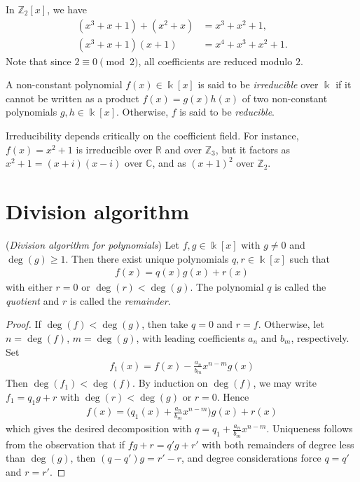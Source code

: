 \documentclass[a4paper, 12pt]{book} %
\begin{document}
\begin{example}
    In $\mathbb{Z}_2[x]$, we have
    \begin{align}
        (x^3 + x + 1) + (x^2 + x) &= x^3 + x^2 + 1, \\
        (x^3 + x + 1)(x + 1) &= x^4 + x^3 + x^2 + 1.
    \end{align}
    Note that since $2 \equiv 0 \pmod 2$, all coefficients are reduced modulo $2$.
\end{example}

\begin{definition}
    A non-constant polynomial $f(x) \in \Bbbk[x]$ is said to be \emph{irreducible} over $\Bbbk$ if it cannot be written as a product $f(x) = g(x)h(x)$ of two non-constant polynomials $g, h \in \Bbbk[x]$. Otherwise, $f$ is said to be \emph{reducible}.
\end{definition}

\begin{remark}
    Irreducibility depends critically on the coefficient field. For instance, $f(x) = x^2 + 1$ is irreducible over $\mathbb{R}$ and over $\mathbb{Z}_3$, but it factors as $x^2 + 1 = (x + i)(x - i)$ over $\mathbb{C}$, and as $(x + 1)^2$ over $\mathbb{Z}_2$.
\end{remark}

\section{Division algorithm}

\begin{theorem}
    (\emph{Division algorithm for polynomials}) Let $f, g \in \Bbbk[x]$ with $g \neq 0$ and $\deg(g) \geq 1$. Then there exist unique polynomials $q, r \in \Bbbk[x]$ such that
    \begin{align}
        f(x) = q(x) g(x) + r(x)
    \end{align}
    with either $r = 0$ or $\deg(r) < \deg(g)$. The polynomial $q$ is called the \emph{quotient} and $r$ is called the \emph{remainder}.
\end{theorem}

\begin{proof}
    If $\deg(f) < \deg(g)$, then take $q = 0$ and $r = f$. Otherwise, let $n = \deg(f)$, $m = \deg(g)$, with leading coefficients $a_n$ and $b_m$, respectively. Set
    \begin{align}
        f_1(x) = f(x) - \frac{a_n}{b_m} x^{n-m} g(x)
    \end{align}
    Then $\deg(f_1) < \deg(f)$. By induction on $\deg(f)$, we may write $f_1 = q_1 g + r$ with $\deg(r) < \deg(g)$ or $r = 0$. Hence
    \begin{align}
        f(x) = \bigg( q_1(x) + \frac{a_n}{b_m} x^{n-m} \bigg) g(x) + r(x)
    \end{align}
    which gives the desired decomposition with $q = q_1 + \frac{a_n}{b_m} x^{n-m}$.     Uniqueness follows from the observation that if $fg + r = q'g + r'$ with both remainders of degree less than $\deg(g)$, then $(q - q')g = r' - r$, and degree considerations force $q = q'$ and $r = r'$.
\end{proof}
\end{document}
